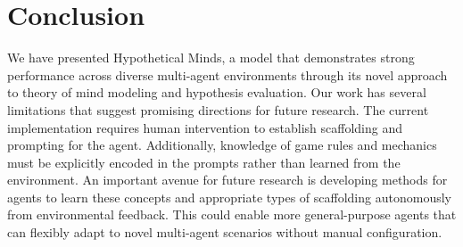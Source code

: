 \documentclass{article} %
\begin{document}

\vspace{-14pt}


\section{Conclusion}
\vspace{-12pt}

We have presented Hypothetical Minds, a model that demonstrates strong performance across diverse multi-agent environments through its novel approach to theory of mind modeling and hypothesis evaluation. Our work has several limitations that suggest promising directions for future research. The current implementation requires human intervention to establish scaffolding and prompting for the agent. Additionally, knowledge of game rules and mechanics must be explicitly encoded in the prompts rather than learned from the environment. An important avenue for future research is developing methods for agents to learn these concepts and appropriate types of scaffolding autonomously from environmental feedback. This could enable more general-purpose agents that can flexibly adapt to novel multi-agent scenarios without manual configuration.
\end{document}
